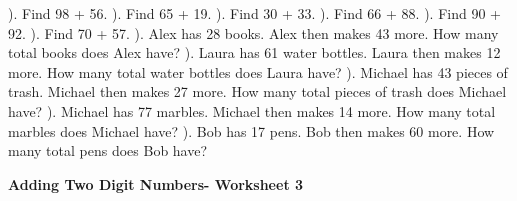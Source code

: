 \documentclass{article}%
\begin{document}
\newline%
). Find 98 + 56.%
\newline%
\newline%
). Find 65 + 19.%
\newline%
\newline%
). Find 30 + 33.%
\newline%
\newline%
). Find 66 + 88.%
\newline%
\newline%
). Find 90 + 92.%
\newline%
\newline%
). Find 70 + 57.%
\newline%
\newline%
). Alex has 28 books. Alex then makes 43 more. How many total books does Alex have?%
\newline%
\newline%
). Laura has 61 water bottles. Laura then makes 12 more. How many total water bottles does Laura have?%
\newline%
\newline%
). Michael has 43 pieces of trash. Michael then makes 27 more. How many total pieces of trash does Michael have?%
\newline%
\newline%
). Michael has 77 marbles. Michael then makes 14 more. How many total marbles does Michael have?%
\newline%
\newline%
). Bob has 17 pens. Bob then makes 60 more. How many total pens does Bob have?%
\newline%
\newline%
\newline%
\pagebreak%
\large%
\begin{center}%
\textbf{Adding Two Digit Numbers- Worksheet 3}%
\newline%
\newline%
\newline%
\end{center} \normalsize%
\end{document}
